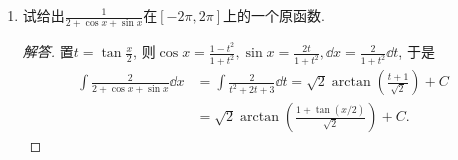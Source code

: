 \begin{2b}
\begin{enumerate}
\item 试给出\(\frac{1}{2+\cos x+\sin x}\)在$[-2\pi,2\pi]$上的一个原函数.
\begin{proof}[解答]
置\(t=\tan\frac{x}{2}\), 则\(\cos x=\frac{1-t^2}{1+t^2},
\sin x=\frac{2t}{1+t^2},\dd x=\frac{2}{1+t^2}\dd t\), 于是
\[\begin{split}
\int\frac{2}{2+\cos x+\sin x}\dd x&=\int \frac{2}{t^2+2t+3}\dd t
=\sqrt{2}\arctan\left(\frac{t+1}{\sqrt{2}}\right)+C\\
&=\sqrt{2}\arctan\left(\frac{1+\tan(x/2)}{\sqrt{2}}\right)+C.
\end{split}\]
\end{proof}
\end{enumerate}
\end{2b}
